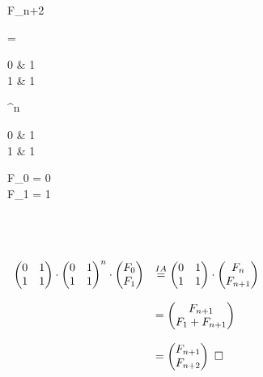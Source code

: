 \documentclass[a4paper,11pt,fleqn]{scrartcl}
\begin{document}
\begin{enumerate}
\begin{enumerate}
\begin{enumerate}
\begin{pmatrix}
						F_{n+2}
					\end{pmatrix}
					= 
					\begin{pmatrix}
						0 & 1 \\
						1 & 1
					\end{pmatrix}
					^n \cdot
					\begin{pmatrix}
						0 & 1 \\
						1 & 1
					\end{pmatrix}
					\cdot
					\begin{pmatrix}
						F_{0} = 0 \\
						F_{1} = 1
					\end{pmatrix}
					\) \\ \\ \\
					\(
					\begin{array}{rl}
					
						\begin{pmatrix}
							0 & 1 \\
							1 & 1
						\end{pmatrix}
						\cdot
						\begin{pmatrix}
							0 & 1 \\
							1 & 1
						\end{pmatrix}
						^n\cdot
						\begin{pmatrix}
							F_{0} \\
							F_{1}
						\end{pmatrix}
						&\overset{IA}{=}
						\begin{pmatrix}
							0 & 1 \\
							1 & 1
						\end{pmatrix}
						\cdot
						\begin{pmatrix}
							F_{n} \\
							F_{n+1}
						\end{pmatrix} \\ \\
						&=
						\begin{pmatrix}
							F_{n+1} \\
							F_{1}+F_{n+1}
						\end{pmatrix} \\ \\
						&=
						\begin{pmatrix}
							F_{n+1} \\
							F_{n+2}
						\end{pmatrix} \qed
					\end{array}
					\) 
					

\end{enumerate}
\end{enumerate}
\end{enumerate}
\end{document}
